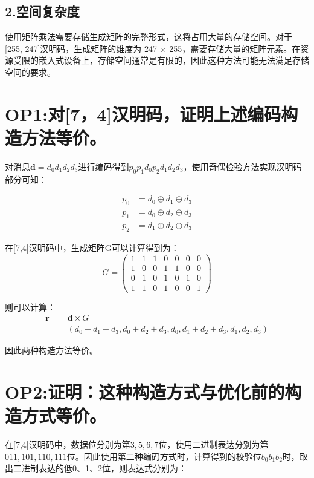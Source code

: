 \documentclass[12pt, a4paper]{ctexart}
\begin{document}
\subsection*{2.空间复杂度}

使用矩阵乘法需要存储生成矩阵的完整形式，这将占用大量的存储空间。对于[255, 247]汉明码，生成矩阵的维度为 247 × 255，需要存储大量的矩阵元素。在资源受限的嵌入式设备上，存储空间通常是有限的，因此这种方法可能无法满足存储空间的要求。

\section*{OP1:对[7，4]汉明码，证明上述编码构造方法等价。}

对消息$\bm{d} = d_0d_1d_2d_3$进行编码得到$p_0p_1d_0p_2d_1d_2d_3$，使用奇偶检验方法实现汉明码部分可知：
    
    $$
    \begin{aligned}
    p_0 &= d_0 \oplus d_1 \oplus d_3\\
    p_1 &= d_0 \oplus d_2 \oplus d_3\\
    p_2 &= d_1 \oplus d_2 \oplus d_3
    \end{aligned}
    $$
    
    在[7,4]汉明码中，生成矩阵G可以计算得到为：
    $$
    G =
    \begin{pmatrix}
    1 & 1 & 1 & 0 & 0 & 0 & 0 \\
    1 & 0 & 0 & 1 & 1 & 0 & 0 \\
    0 & 1 & 0 & 1 & 0 & 1 & 0 \\
    1 & 1 & 0 & 1 & 0 & 0 & 1 
    \end{pmatrix}
    $$

    则可以计算：
    $$
    \begin{aligned}
    \bm{r} &= \bm{d} \times G \\
           &= (d_0 + d_1 + d_3, d_0 + d_2 + d_3, d_0, d_1 + d_2 + d_3, d_1, d_2, d_3)
    \end{aligned}
    $$

    因此两种构造方法等价。


\section*{OP2:证明：这种构造方式与优化前的构造方式等价。}
    
    在[7,4]汉明码中，数据位分别为第$3,5,6,7$位，使用二进制表达分别为第$011, 101, 110, 111$位。因此使用第二种编码方式时，计算得到的校验位$b_0b_1b_2$时，取出二进制表达的低0、1、2位，则表达式分别为：
\end{document}
